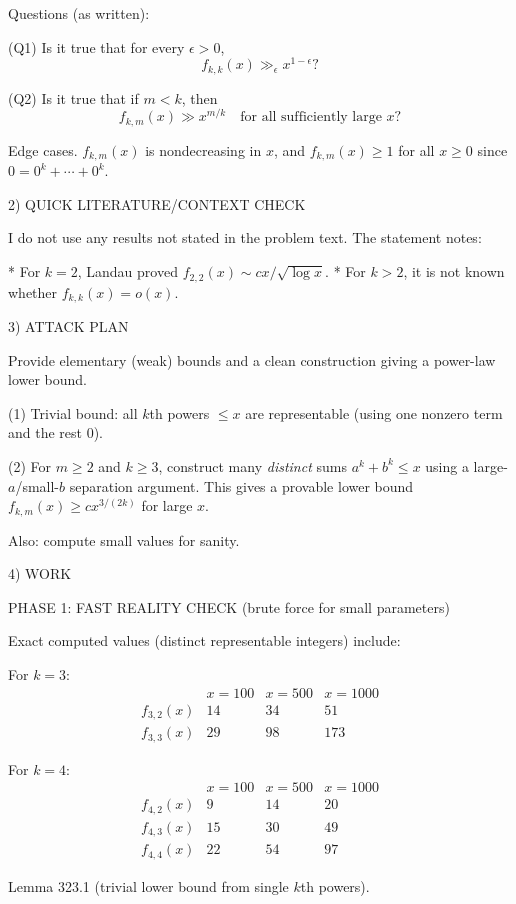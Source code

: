 Questions (as written):

(Q1) Is it true that for every $\epsilon>0$,
\[
f_{k,k}(x)\gg_\epsilon x^{1-\epsilon}?\]

(Q2) Is it true that if $m<k$, then
\[
f_{k,m}(x)\gg x^{m/k}\quad\text{for all sufficiently large }x?\]

Edge cases.
$f_{k,m}(x)$ is nondecreasing in $x$, and $f_{k,m}(x)\ge 1$ for all $x\ge 0$ since $0=0^k+\cdots+0^k$.


2) QUICK LITERATURE/CONTEXT CHECK

I do not use any results not stated in the problem text.
The statement notes:

* For $k=2$, Landau proved $f_{2,2}(x)\sim c x/\sqrt{\log x}$.
* For $k>2$, it is not known whether $f_{k,k}(x)=o(x)$.


3) ATTACK PLAN

Provide elementary (weak) bounds and a clean construction giving a power-law lower bound.

(1) Trivial bound: all $k$th powers $\le x$ are representable (using one nonzero term and the rest $0$).

(2) For $m\ge 2$ and $k\ge 3$, construct many \emph{distinct} sums $a^k+b^k\le x$ using a large-$a$/small-$b$ separation argument.
This gives a provable lower bound $f_{k,m}(x)\ge c x^{3/(2k)}$ for large $x$.

Also: compute small values for sanity.


4) WORK

PHASE 1: FAST REALITY CHECK (brute force for small parameters)

Exact computed values (distinct representable integers) include:

For $k=3$:
\[
\begin{array}{c|ccc}
 & x=100 & x=500 & x=1000\\\hline
f_{3,2}(x) & 14 & 34 & 51\\
f_{3,3}(x) & 29 & 98 & 173
\end{array}
\]

For $k=4$:
\[
\begin{array}{c|ccc}
 & x=100 & x=500 & x=1000\\\hline
f_{4,2}(x) & 9 & 14 & 20\\
f_{4,3}(x) & 15 & 30 & 49\\
f_{4,4}(x) & 22 & 54 & 97
\end{array}
\]


Lemma 323.1 (trivial lower bound from single $k$th powers).

